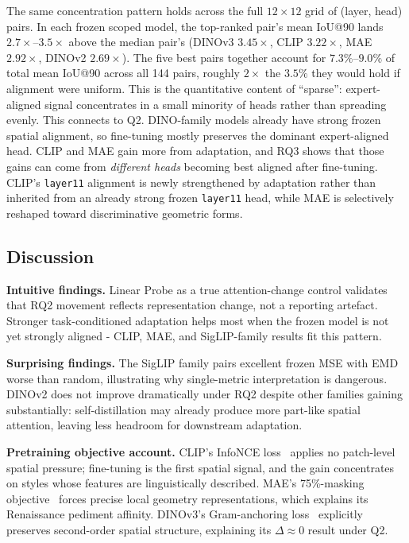 \documentclass[lineno,pdflatex,sn-mathphys-num]{sn-jnl}%
\theoremstyle{thmstyleone}%
\theoremstyle{thmstyletwo}%
\theoremstyle{thmstylethree}%
\begin{document}
The same concentration pattern holds across the full $12 \times 12$ grid of (layer, head) pairs. In each frozen scoped model, the top-ranked pair's mean IoU@90 lands $2.7\times$--$3.5\times$ above the median pair's (DINOv3 $3.45\times$, CLIP $3.22\times$, MAE $2.92\times$, DINOv2 $2.69\times$). The five best pairs together account for $7.3\%$--$9.0\%$ of total mean IoU@90 across all 144 pairs, roughly $2\times$ the $3.5\%$ they would hold if alignment were uniform. This is the quantitative content of ``sparse'': expert-aligned signal concentrates in a small minority of heads rather than spreading evenly. This connects to Q2. DINO-family models already have strong frozen spatial alignment, so fine-tuning mostly preserves the dominant expert-aligned head. CLIP and MAE gain more from adaptation, and RQ3 shows that those gains can come from \emph{different heads} becoming best aligned after fine-tuning. CLIP's \texttt{layer11} alignment is newly strengthened by adaptation rather than inherited from an already strong frozen \texttt{layer11} head, while MAE is selectively reshaped toward discriminative geometric forms.


\subsection{Discussion}

\textbf{Intuitive findings.} Linear Probe as a true attention-change control validates that RQ2 movement reflects representation change, not a reporting artefact. Stronger task-conditioned adaptation helps most when the frozen model is not yet strongly aligned - CLIP, MAE, and SigLIP-family results fit this pattern.

\textbf{Surprising findings.} The SigLIP family pairs excellent frozen MSE with EMD worse than random, illustrating why single-metric interpretation is dangerous. DINOv2 does not improve dramatically under RQ2 despite other families gaining substantially: self-distillation may already produce more part-like spatial attention, leaving less headroom for downstream adaptation.

\textbf{Pretraining objective account.} CLIP's InfoNCE loss~\cite{Radford21CLIP} applies no patch-level spatial pressure; fine-tuning is the first spatial signal, and the gain concentrates on styles whose features are linguistically described. MAE's 75\%-masking objective~\cite{He22MAE} forces precise local geometry representations, which explains its Renaissance pediment affinity. DINOv3's Gram-anchoring loss~\cite{Simeoni26DINOv3} explicitly preserves second-order spatial structure, explaining its $\Delta\!\approx\!0$ result under Q2.
\end{document}

